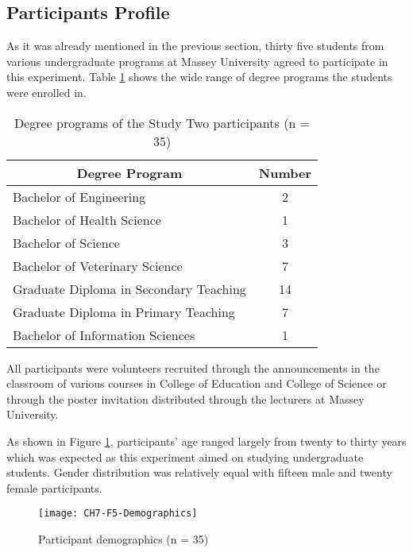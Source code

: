 \FloatBarrier

\subsection{Participants Profile}

As it was already mentioned in the previous section, thirty five students from
various undergraduate programs at Massey University agreed to participate in
this experiment. Table \ref{tab:degree} shows the wide range of degree programs
the students were enrolled in.

\begin{table}[htb]
  \begin{center}
    \begin{tabular}{| l | c |}
    \hline
     \multicolumn{1}{|c|}{\textbf{Degree Program}} &
     \multicolumn{1}{c|}{\textbf{Number}} \\
     \hline
     Bachelor of Engineering & 2 \\ \hline
     Bachelor of Health Science & 1 \\ \hline
     Bachelor of Science & 3 \\ \hline
     Bachelor of Veterinary Science & 7 \\ \hline
     Graduate Diploma in Secondary Teaching & 14 \\ \hline
     Graduate Diploma in Primary Teaching & 7 \\ \hline
     Bachelor of Information Sciences & 1 \\ \hline
    \end{tabular}
  \end{center}
  \caption{Degree programs of the Study Two participants (n = 35)}
  \label{tab:degree}
\end{table}

All participants were volunteers recruited through the announcements in the
classroom of various courses in College of Education and College of Science or
through the poster invitation distributed through the lecturers at Massey
University.

As shown in Figure \ref{fig:demograph}, participants' age ranged largely from
twenty to thirty years which was expected as this experiment aimed on studying
undergraduate students. Gender distribution was relatively equal with fifteen
male and twenty female participants.

\begin{figure}[htb]
\centering
\texttt{[image: CH7-F5-Demographics]}
\caption{Participant demographics (n = 35)}
\label{fig:demograph}
\end{figure}

